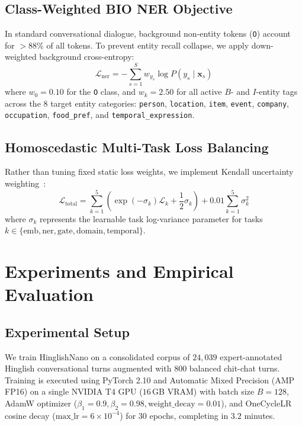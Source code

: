 \documentclass[11pt,a4paper]{article}
\begin{document}
\subsection{Class-Weighted BIO NER Objective}
In standard conversational dialogue, background non-entity tokens (\texttt{O}) account for $>88\%$ of all tokens. To prevent entity recall collapse, we apply down-weighted background cross-entropy:
\begin{equation}
    \mathcal{L}_{\text{ner}} = -\sum_{s=1}^S w_{y_s} \log P(y_s \mid \mathbf{x}_s)
\end{equation}
where $w_0 = 0.10$ for the \texttt{O} class, and $w_{k} = 2.50$ for all active $B$- and $I$-entity tags across the 8 target entity categories: \texttt{person}, \texttt{location}, \texttt{item}, \texttt{event}, \texttt{company}, \texttt{occupation}, \texttt{food\_pref}, and \texttt{temporal\_expression}.

\subsection{Homoscedastic Multi-Task Loss Balancing}
Rather than tuning fixed static loss weights, we implement Kendall uncertainty weighting~\cite{kendall2018multi}:
\begin{equation}
    \mathcal{L}_{\text{total}} = \sum_{k=1}^5 \left( \exp(-\sigma_k) \mathcal{L}_k + \frac{1}{2} \sigma_k \right) + 0.01 \sum_{k=1}^5 \sigma_k^2
\end{equation}
where $\sigma_k$ represents the learnable task log-variance parameter for tasks $k \in \{\text{emb}, \text{ner}, \text{gate}, \text{domain}, \text{temporal}\}$.

\section{Experiments and Empirical Evaluation}

\subsection{Experimental Setup}
We train HinglishNano on a consolidated corpus of $24,039$ expert-annotated Hinglish conversational turns augmented with $800$ balanced chit-chat turns. Training is executed using PyTorch 2.10 and Automatic Mixed Precision (AMP FP16) on a single NVIDIA T4 GPU ($16$\,GB VRAM) with batch size $B=128$, AdamW optimizer ($\beta_1=0.9, \beta_2=0.98, \text{weight\_decay}=0.01$), and OneCycleLR cosine decay ($\text{max\_lr}=6 \times 10^{-4}$) for $30$ epochs, completing in $3.2$ minutes.
\end{document}
